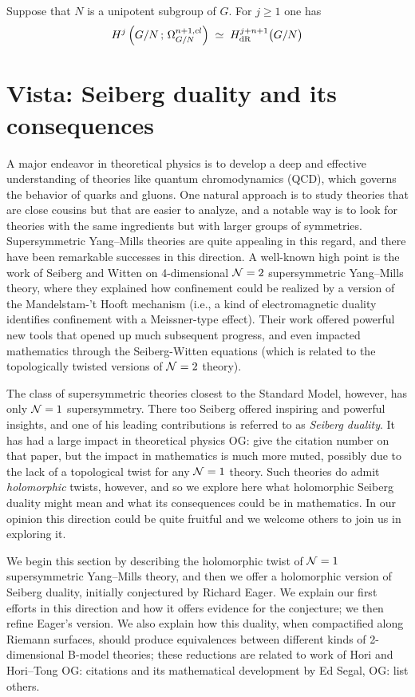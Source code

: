 \documentclass[11pt]{amsart}
\def\owen#1{{\textcolor{violet!65!black}{OG: {#1}}}}
\begin{document}
Suppose that $N$ is a unipotent subgroup of $G$.
For $j \geq 1$ one has
\[
H^j \left( G / N \, ; \, \Omega^{n+1,cl}_{G/N} \right) \; \simeq \; H_{\rm dR}^{j+n+1} \big(G / N \big)
\]


\section{Vista: Seiberg duality and its consequences}
\label{sec: seiberg}

A major endeavor in theoretical physics is to develop a deep and effective understanding of theories like quantum chromodynamics (QCD), which governs the behavior of quarks and gluons.
One natural approach is to study theories that are close cousins but that are easier to analyze,
and a notable way is to look for theories with the same ingredients but with larger groups of symmetries.
Supersymmetric Yang--Mills theories are quite appealing in this regard,
and there have been remarkable successes in this direction.
A well-known high point is the work of Seiberg and Witten on 4-dimensional $\mathcal N =2$ supersymmetric Yang--Mills theory,
where they explained how confinement could be realized by a version of the Mandelstam-'t Hooft mechanism (i.e., a kind of electromagnetic duality identifies confinement with a Meissner-type effect).
Their work offered powerful new tools that opened up much subsequent progress,
and even impacted mathematics through the Seiberg-Witten equations (which is related to the topologically twisted versions of $\mathcal N=2$ theory).

The class of supersymmetric theories closest to the Standard Model, however, has only $\mathcal N=1$ supersymmetry.
There too Seiberg offered inspiring and powerful insights,
and one of his leading contributions is referred to as {\em Seiberg duality}.
It has had a large impact in theoretical physics \owen{give the citation number on that paper},
but the impact in mathematics is much more muted,
possibly due to the lack of a topological twist for any $\mathcal N=1$ theory.
Such theories do admit {\em holomorphic} twists, however, 
and so we explore here what holomorphic Seiberg duality might mean and what its consequences could be in mathematics.
In our opinion this direction could be quite fruitful and we welcome others to join us in exploring it.

We begin this section by describing the holomorphic twist of $\mathcal N=1$ supersymmetric Yang--Mills theory,
and then we offer a holomorphic version of Seiberg duality, 
initially conjectured by Richard Eager.
We explain our first efforts in this direction and how it offers evidence for the conjecture;
we then refine Eager's version.
We also explain how this duality, when compactified along Riemann surfaces,
should produce equivalences between different kinds of 2-dimensional B-model theories;
these reductions are related to work of Hori and Hori--Tong \owen{citations} and its mathematical development by Ed Segal, \owen{list others}.
\end{document}
